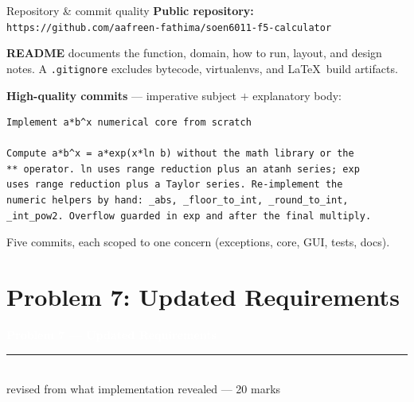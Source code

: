 \documentclass[10pt,aspectratio=169]{beamer}
\begin{document}
\begin{frame}[fragile]{Repository \& commit quality}
  \small
  \textbf{Public repository:}\\
  \texttt{\small https://github.com/aafreen-fathima/soen6011-f5-calculator}
  \vspace{0.5em}

  \textbf{README} documents the function, domain, how to run, layout, and design notes. A \texttt{.gitignore} excludes bytecode, virtualenvs, and \LaTeX\ build artifacts.
  \vspace{0.5em}

  \textbf{High-quality commits} --- imperative subject $+$ explanatory body:
\begin{lstlisting}[basicstyle=\ttfamily\scriptsize,frame=single,framesep=4pt,backgroundcolor=\color{black!5},aboveskip=3pt,belowskip=2pt]
Implement a*b^x numerical core from scratch

Compute a*b^x = a*exp(x*ln b) without the math library or the
** operator. ln uses range reduction plus an atanh series; exp
uses range reduction plus a Taylor series. Re-implement the
numeric helpers by hand: _abs, _floor_to_int, _round_to_int,
_int_pow2. Overflow guarded in exp and after the final multiply.
\end{lstlisting}
  \footnotesize\textcolor{mLightTeal}{Five commits, each scoped to one concern (exceptions, core, GUI, tests, docs).}
\end{frame}

\section{Problem 7: Updated Requirements}
{
\begin{frame}[plain]
  \vfill
  \begin{center}
    {\Large\bfseries\textcolor{white}{Problem 7 --- Updated Requirements}}\\[0.5em]
    \textcolor{mAccent}{\rule{0.4\textwidth}{1.0pt}}\\[0.5em]
    {\normalsize\textcolor{white!85!black}{revised from what implementation revealed --- 20 marks}}
  \end{center}
  \vfill
\end{frame}}
\end{document}
